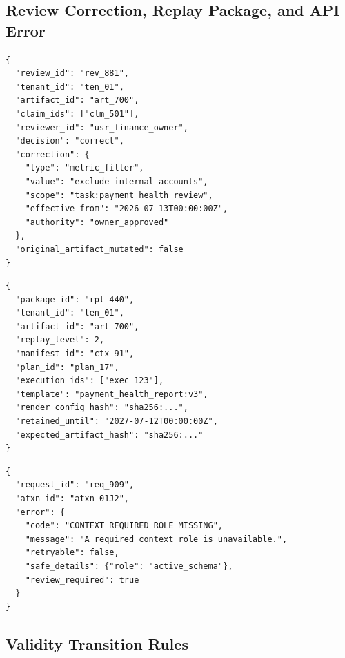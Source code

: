 \documentclass[10pt]{article}
\begin{document}
\Needspace{0.55\textheight}
\subsection{Review Correction, Replay Package, and API Error}

\begin{lstlisting}[style=contract,title={Review correction}]
{
  "review_id": "rev_881",
  "tenant_id": "ten_01",
  "artifact_id": "art_700",
  "claim_ids": ["clm_501"],
  "reviewer_id": "usr_finance_owner",
  "decision": "correct",
  "correction": {
    "type": "metric_filter",
    "value": "exclude_internal_accounts",
    "scope": "task:payment_health_review",
    "effective_from": "2026-07-13T00:00:00Z",
    "authority": "owner_approved"
  },
  "original_artifact_mutated": false
}
\end{lstlisting}

\begin{lstlisting}[style=contract,title={Replay package}]
{
  "package_id": "rpl_440",
  "tenant_id": "ten_01",
  "artifact_id": "art_700",
  "replay_level": 2,
  "manifest_id": "ctx_91",
  "plan_id": "plan_17",
  "execution_ids": ["exec_123"],
  "template": "payment_health_report:v3",
  "render_config_hash": "sha256:...",
  "retained_until": "2027-07-12T00:00:00Z",
  "expected_artifact_hash": "sha256:..."
}
\end{lstlisting}

\begin{lstlisting}[style=contract,title={API error response}]
{
  "request_id": "req_909",
  "atxn_id": "atxn_01J2",
  "error": {
    "code": "CONTEXT_REQUIRED_ROLE_MISSING",
    "message": "A required context role is unavailable.",
    "retryable": false,
    "safe_details": {"role": "active_schema"},
    "review_required": true
  }
}
\end{lstlisting}

\subsection{Validity Transition Rules}
\end{document}
